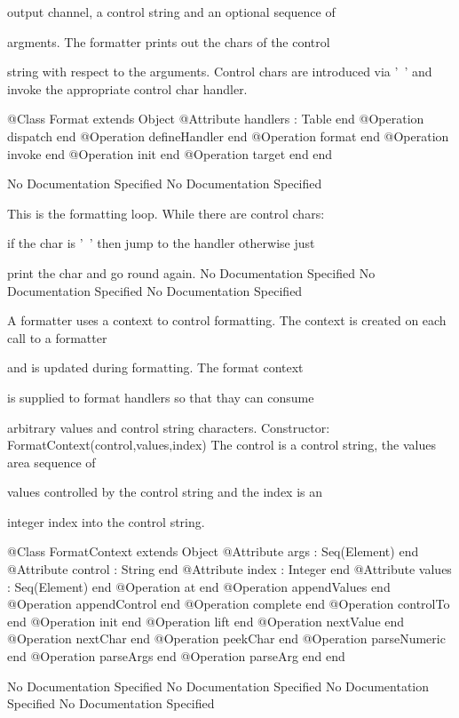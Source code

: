       output channel, a control string and an optional sequence of

      argments. The formatter prints out the chars of the control

      string with respect to the arguments. Control chars are 
      introduced via '~' and invoke the appropriate control char handler.
\begin{Interface}
@Class Format extends Object
  @Attribute handlers : Table end
  @Operation dispatch end
  @Operation defineHandler end
  @Operation format end
  @Operation invoke end
  @Operation init end
  @Operation target end
end
\end{Interface}
No Documentation Specified
No Documentation Specified

        This is the formatting loop. While there are control chars:

        if the char is '~' then jump to the handler otherwise just

         print the char and go round again.
No Documentation Specified
No Documentation Specified
No Documentation Specified

      A formatter uses a context to control formatting.
      The context is created on each call to a formatter

      and is updated during formatting. The format context

      is supplied to format handlers so that thay can consume

      arbitrary values and control string characters.
      Constructor: FormatContext(control,values,index)
        The control is a control string, the values area sequence of

        values controlled by the control string and the index is an

        integer index into the control string.
\begin{Interface}
@Class FormatContext extends Object
  @Attribute args : Seq(Element) end
  @Attribute control : String end
  @Attribute index : Integer end
  @Attribute values : Seq(Element) end
  @Operation at end
  @Operation appendValues end
  @Operation appendControl end
  @Operation complete end
  @Operation controlTo end
  @Operation init end
  @Operation lift end
  @Operation nextValue end
  @Operation nextChar end
  @Operation peekChar end
  @Operation parseNumeric end
  @Operation parseArgs end
  @Operation parseArg end
end
\end{Interface}
No Documentation Specified
No Documentation Specified
No Documentation Specified
No Documentation Specified

